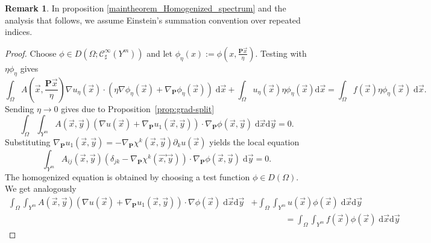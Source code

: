 \documentclass[a4paper,reqno]{amsart}
\numberwithin{equation}{section}
\numberwithin{equation}{section}		%
\numberwithin{figure}{section}			%
\numberwithin{table}{section}				%
\theoremstyle{definition}
\newtheorem{remark}[theorem]{Remark}
\newcommand{\<}{\ensuremath \leq}
\renewcommand{\>}{\ensuremath \geq}
\def\e{\eta}
\begin{document}
\begin{remark}
In proposition \ref{maintheorem_Homogenized_spectrum} and the analysis that follows, we assume Einstein's summation convention over repeated indices.  
\end{remark}
\begin{proof}
Choose $\phi \in D(\Omega;\mathcal{C}^\infty_\sharp(Y^m))$ and let
$\phi_\e(x):= \phi(x,\frac{{\textbf{P}} \vec{x}}{\e})$. Testing with $\e \phi_\e$ gives
 \begin{equation*}  \label{eq:weak_static_eps}
    \int_\Omega A\left(\vec{x},\frac{\textbf{P} \vec{x}}{\e}\right)  \nabla u_\e(\vec{x}) \cdot \left(\e \nabla \phi_\e(\vec{x}) + \nabla_\textbf{P} \phi_\e(\vec{x})\right) \; \mathrm{d}\vec{x}
    +\int_\Omega u_\e(\vec{x}) \e\phi_\e(\vec{x}) \mathrm{d}\vec{x}
    = \int_\Omega f (\vec{x}) \e  \phi_\e(\vec{x})\; \mathrm{d}\vec{x}.
\end{equation*}
Sending $\e \to 0$ gives due to Proposition~\ref{prop:grad-split}
 \begin{equation*}  \label{eq:locallimit_static}
    \int_\Omega  \int_{Y^m} A\left(\vec{x},\vec{y} \right) \left(\nabla u(\vec{x}) +  \nabla_\textbf{P} u_1(\vec{x}, \vec{y})\right) \cdot \nabla_\textbf{P} \phi(\vec{x}, \vec{y}) \; \mathrm{d}\vec{x} \mathrm{d}\vec{y}= 0.
\end{equation*}
Substituting $ \nabla_\textbf{P} u_1(\vec{x}, \vec{y}) = - \nabla_\textbf{P} \chi^k (\vec{x},\vec{y})\partial_{k}u(\vec{x})$ yields the local equation
\begin{equation*}  \label{eq:local_static_proof}
    \int_{Y^m} A_{ij}\left(\vec{x},\vec{y} \right) \left( \delta_{jk} -  \nabla_{\textbf{P}}\chi^k (\vec{x,}\vec{y})\right)\cdot \nabla_{\textbf{P}} \phi(\vec{x},\vec{y}) \; \mathrm{d}\vec{y}=0.
\end{equation*}
The homogenized equation is obtained by choosing a test function $\phi \in D(\Omega)$. We get analogously
 \begin{equation*}  \label{eq:globallimit_static}
    \begin{split}
    \int_\Omega  \int_{Y^m} A\left(\vec{x},\vec{y} \right) \left( \nabla u(\vec{x}) +  \nabla_\textbf{P} u_1(\vec{x}, \vec{y})\right) \cdot \nabla \phi(\vec{x}) \; \mathrm{d}\vec{x} \mathrm{d}\vec{y}
    &+ \int_\Omega  \int_{Y^m} u(\vec{x})  \phi(\vec{x}) \; \mathrm{d}\vec{x} \mathrm{d}\vec{y}
    \\&\qquad\qquad
    =   \int_\Omega  \int_{Y^m} f (\vec{x})  \phi(\vec{x}) \; \mathrm{d}\vec{x} \mathrm{d}\vec{y}
    \end{split}

\end{equation*}
\end{proof}
\end{document}

